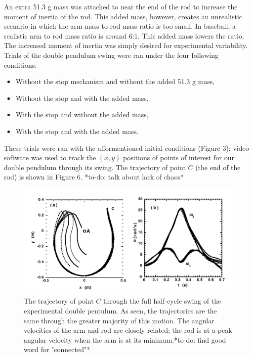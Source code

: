 \documentclass[%
 aip,
 amsmath,amssymb,
 reprint,%
 floatfix,%
]{revtex4-1}
\begin{document}
An extra 51.3 g mass was attached to near the end of the rod to increase the moment of inertia of the rod. This added mass, however, creates an unrealistic scenario in which the arm mass to rod mass ratio is too small. In baseball, a realistic arm to rod mass ratio is around 6:1. This added mass lowers the ratio. The increased moment of inertia was simply desired for experimental variability. Trials of the double pendulum swing were ran under the four following conditions:

\begin{itemize}
	\item Without the stop mechanism and without the added 51.3 g mass,
	\item Without the stop and with the added mass,
	\item With the stop and without the added mass,
	\item With the stop and with the added mass.
\end{itemize}



These trials were ran with the afformentioned initial conditions (Figure 3); video software was used to track the $(x,y)$ positions of points of interest for our double pendulum through its swing. The trajectory of point $C$ (the end of the rod) is shown in Figure 6. *to-do: talk about lack of chaos*

\begin{figure}[H]
	\centering
	\includegraphics[scale=0.4]{trajectory.png}
	\caption{The trajectory of point $C$ through the full half-cycle swing of the experimental double pentulum. As seen, the trajectories are the same through the greater majority of this motion. The angular velocities of the arm and rod are closely related; the rod is at a peak angular velocity when the arm is at its minimum.*to-do: find good word for "connected"*}
\end{figure}
\end{document}
